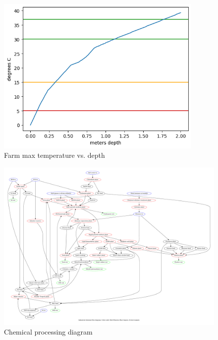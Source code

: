 \documentclass[fleqn,10pt]{Stylesheet} %
\begin{document}
\begin{figure}
    \centering
    \includegraphics[width=100mm]{figures/fig_bp.png}
    \caption{Farm max temperature vs. depth}
    \label{fig:farm}
\end{figure}

\begin{figure}
    \centering
    \includegraphics[width=\linewidth]{figures/fig_chem.pdf}
    \caption{Chemical processing diagram}
    \label{fig:chem_diagram}
\end{figure}


\end{document}
